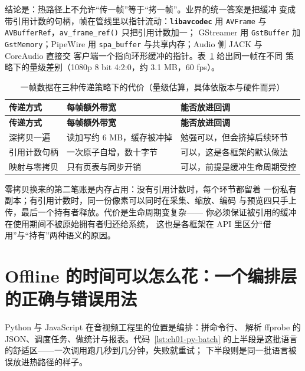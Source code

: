 \documentclass[12pt,a4paper,fontset=fandol]{ctexbook}
\newcommand{\Fn}[1]{\texttt{#1()}}
\newcommand{\Tp}[1]{\texttt{#1}}
\newcommand{\Lib}[1]{\textbf{\texttt{#1}}}
\newcommand{\Lang}[1]{\textsf{#1}}
\newcommand{\PY}{\Lang{Python}}
\newcommand{\DomAud}{\Lang{Audio}}
\newcommand{\DomBatch}{\Lang{Offline}}
\begin{document}
结论是：热路径上不允许``传一帧''等于``拷一帧''。业界的统一答案是把缓冲
变成带引用计数的句柄，帧在管线里以指针流动：\Lib{libavcodec} 用
\Tp{AVFrame} 与 \Tp{AVBufferRef}，\Fn{av\_frame\_ref} 只把引用计数加一；
GStreamer 用 \Tp{GstBuffer} 加 \Tp{GstMemory}；PipeWire 用
\Tp{spa\_buffer} 与共享内存；\DomAud{} 侧 JACK 与 CoreAudio 直接交
客户端一个指向环形缓冲的指针。表~\ref{tab:ch01-copy} 给出同一帧在不同
策略下的量级差别（1080p 8 bit 4:2:0，约 3.1 MB，60 fps）。

\begin{longtable}{>{\raggedright\arraybackslash}p{}
                  >{\raggedright\arraybackslash}p{}
                  >{\raggedright\arraybackslash}p{}}
\caption{一帧数据在三种传递策略下的代价（量级估算，具体依版本与硬件而异）}\label{tab:ch01-copy} \\
\toprule
\textbf{传递方式} & \textbf{每帧额外带宽} & \textbf{能否放进回调} \\
\midrule
\endfirsthead
\toprule
\textbf{传递方式} & \textbf{每帧额外带宽} & \textbf{能否放进回调} \\
\midrule
\endhead
\midrule
\bottomrule
\endlastfoot
深拷贝一遍 & 读加写约 6 MB，缓存被冲掉 & 勉强可以，但会挤掉后续环节 \\
引用计数句柄 & 一次原子自增，数十字节 & 可以，这是各框架的默认做法 \\
映射与零拷贝 & 只有页表与同步开销 & 可以，前提是缓冲生命周期受控 \\
\end{longtable}

零拷贝换来的第二笔账是内存占用：没有引用计数时，每个环节都留着
一份私有副本；有引用计数时，同一份像素可以同时在采集、缩放、编码
与预览四只手上传，最后一个持有者释放。代价是生命周期变复杂——
你必须保证被引用的缓冲在使用期间不被原始拥有者归还给系统，
这也是各框架在 API 里区分``借用''与``持有''两种语义的原因。

\section{\DomBatch{} 的时间可以怎么花：一个编排层的正确与错误用法}
\label{sec:ch01-python-role}

\PY{} 与 \Lang{JavaScript}{} 在音视频工程里的位置是编排：拼命令行、
解析 ffprobe 的 JSON、调度任务、做统计与报表。代码~\ref{lst:ch01-py-batch}
的上半段是这批语言的舒适区——一次调用跑几秒到几分钟，失败就重试；
下半段则是同一批语言被误放进热路径的样子。
\end{document}
